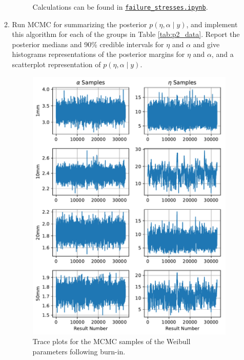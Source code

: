 \documentclass[letterpaper,11pt]{article}
\begin{document}
\begin{enumerate}
\begin{enumerate}
\begin{description}
      Calculations can be found in
      \href{http://nbviewer.jupyter.org/github/ppham27/stat570/blob/master/hw6/failure\_stresses.ipynb}{\texttt{failure\_stresses.ipynb}}.
    \end{description}
  \item Run MCMC for summarizing the posterior
    $p\left(\eta, \alpha \mid y\right)$, and implement this algorithm for each
    of the groups in Table \ref{tab:p2_data}. Report the posterior medians and
    90\% credible intervals for $\eta$ and $\alpha$ and give histograms
    representations of the posterior margins for $\eta$ and $\alpha$, and a
    scatterplot representation of $p\left(\eta, \alpha \mid y\right)$.

    \begin{figure}
      \centering
      \includegraphics{p2_trace.pdf}
      \caption{Trace plots for the MCMC samples of the Weibull parameters
        following burn-in.}
      \label{fig:p2_trace}
    \end{figure}


\end{enumerate}
\end{enumerate}
\end{document}
